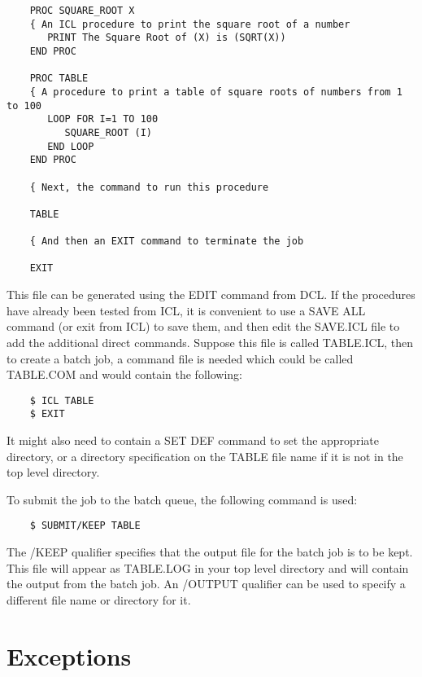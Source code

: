 \begin{small}
\begin{verbatim}
    PROC SQUARE_ROOT X
    { An ICL procedure to print the square root of a number
       PRINT The Square Root of (X) is (SQRT(X))
    END PROC
    
    PROC TABLE
    { A procedure to print a table of square roots of numbers from 1 to 100
       LOOP FOR I=1 TO 100
          SQUARE_ROOT (I)
       END LOOP
    END PROC

    { Next, the command to run this procedure

    TABLE

    { And then an EXIT command to terminate the job 

    EXIT
\end{verbatim}
\end{small}

This file can be generated using the EDIT command from DCL.
If the procedures have already been tested from ICL, it is convenient to use
a SAVE ALL command (or exit from ICL) to save them, and then edit the SAVE.ICL
file to add the additional direct commands.
Suppose this file is called TABLE.ICL, then to create a batch job, a command
file is needed which could be called TABLE.COM and would contain the following:

\begin{small}
\begin{verbatim}
    $ ICL TABLE
    $ EXIT
\end{verbatim}
\end{small}

It might also need to contain a SET DEF command to set the appropriate
directory, or a directory specification on the TABLE file name if it is
not in the top level directory.

To submit the job to the batch queue, the following command is used:

\begin{small}
\begin{verbatim}
    $ SUBMIT/KEEP TABLE
\end{verbatim}
\end{small}

The /KEEP qualifier specifies that the output file for the batch job is
to be kept.
This file will appear as TABLE.LOG in your top level directory and will contain
the output from the batch job.
An /OUTPUT qualifier can be used to specify a different file name or directory
for it.

\section{Exceptions}
\label{S_excep}

